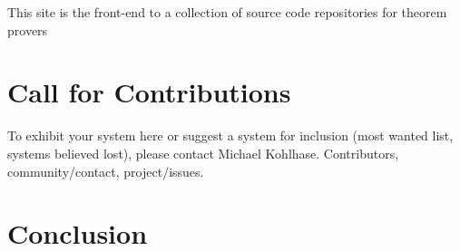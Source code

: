 \documentclass[smallcondensed]{svjour3}
\begin{document}
This site is the front-end to a collection of source code repositories for theorem provers

\section{Call for Contributions}

To exhibit your system here or suggest a system for inclusion (most wanted
list, systems believed lost), please contact Michael Kohlhase. Contributors,
community/contact, project/issues.

\section{Conclusion}\label{sec:concl}

\begin{acknowledgements}
\end{acknowledgements}

\printbibliography
\end{document}
